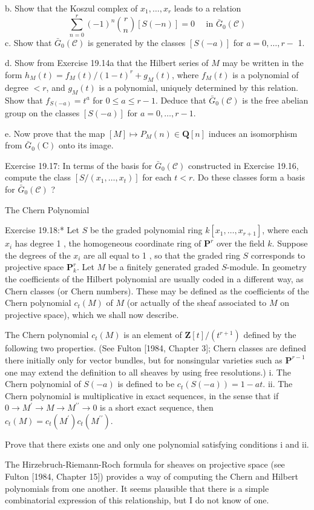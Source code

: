 \documentclass[10pt, letterpaper]{article}
\begin{document}
b. Show that the Koszul complex of $x_1, \ldots, x_r$ leads to a relation
$$
\sum_{n=0}^r(-1)^n\binom{r}{n}[S(-n)]=0 \quad \text { in } \bar{G}_0(\mathcal{C})
$$
c. Show that $\bar{G}_0(\mathcal{C})$ is generated by the classes $[S(-a)]$ for $a=0, \ldots, r-$ 1.

d. Show from Exercise 19.14a that the Hilbert series of $M$ may be written in the form $h_M(t)=f_M(t) /(1-t)^r+g_M(t)$, where $f_M(t)$ is a polynomial of degree $<r$, and $g_M(t)$ is a polynomial, uniquely determined by this relation. Show that $f_{S(-a)}=t^a$ for $0 \leq a \leq r-1$. Deduce that $\bar{G}_0(\mathcal{C})$ is the free abelian group on the classes $[S(-a)]$ for $a=0, \ldots, r-1$.

e. Now prove that the map $[M] \mapsto P_M(n) \in \mathbf{Q}[n]$ induces an isomorphism from $\bar{G}_0(\mathrm{C})$ onto its image.

Exercise 19.17: In terms of the basis for $\bar{G}_0(\mathcal{C})$ constructed in Exercise 19.16, compute the class $\left[S /\left(x_1, \ldots, x_t\right)\right]$ for each $t<r$. Do these classes form a basis for $\bar{G}_0(\mathcal{C})$ ?


The Chern Polynomial

Exercise 19.18:* Let $S$ be the graded polynomial ring $k\left[x_1, \ldots, x_{r+1}\right]$, where each $x_i$ has degree 1 , the homogeneous coordinate ring of $\mathbf{P}^r$ over the field $k$. Suppose the degrees of the $x_i$ are all equal to 1 , so that the graded ring $S$ corresponds to projective space $\mathbf{P}_k^r$. Let $M$ be a finitely generated graded $S$-module. In geometry the coefficients of the Hilbert polynomial are usually coded in a different way, as Chern classes (or Chern numbers). These may be defined as the coefficients of the Chern polynomial $c_t(M)$ of $M$ (or actually of the sheaf associated to $M$ on projective space), which we shall now describe.

The Chern polynomial $c_t(M)$ is an element of $\mathbf{Z}[t] /\left(t^{r+1}\right)$ defined by the following two properties. (See Fulton [1984, Chapter 3]; Chern classes are defined there initially only for vector bundles, but for nonsingular varieties such as $\mathbf{P}^{r-1}$ one may extend the definition to all sheaves by using free resolutions.)
i. The Chern polynomial of $S(-a)$ is defined to be $c_t(S(-a))=1-a t$.
ii. The Chern polynomial is multiplicative in exact sequences, in the sense that if $0 \rightarrow M^{\prime} \rightarrow M \rightarrow M^{\prime \prime} \rightarrow 0$ is a short exact sequence, then $c_t(M)=c_t\left(M^{\prime}\right) c_t\left(M^{\prime \prime}\right)$.

Prove that there exists one and only one polynomial satisfying conditions i and ii.

The Hirzebruch-Riemann-Roch formula for sheaves on projective space (see Fulton [1984, Chapter 15]) provides a way of computing the Chern and Hilbert polynomials from one another. It seems plausible that there is a simple combinatorial expression of this relationship, but I do not know of one.


\pagebreak
\printbibliography
\end{document}
